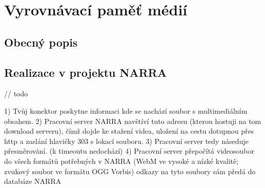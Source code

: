 \section{Vyrovnávací paměť médií}
\subsection{Obecný popis}
\par 
\subsection{Realizace v projektu NARRA}
\par // todo


1) Tvůj konektor poskytne informaci kde se nachází soubor s multimediálním obsahem.
2) Pracovní server NARRA navštíví tuto adresu (kterou hostuji na tom download serveru), čímž dojde ke stažení videa, uložení na cestu dotupnou přes http a zaslání hlavičky 303 s lokací souboru.
3) Pracovní server tedy náseduje přesměrování. (k timeoutu nedochází)
4) Pracovní server přepočítá videosoubor do všech formátů potřebných v NARRA (WebM ve vysoké a nízké kvalitě; zvukový soubor ve formátu OGG Vorbis) odkazy na tyto soubory sám předá do databáze NARRA